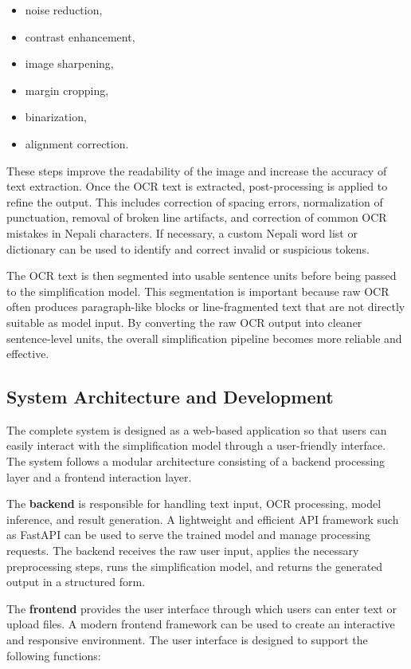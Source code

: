 \documentclass[12pt]{report}
\begin{document}
\begin{itemize}
    \item noise reduction,
    \item contrast enhancement,
    \item image sharpening,
    \item margin cropping,
    \item binarization,
    \item alignment correction.
\end{itemize}

These steps improve the readability of the image and increase the accuracy of text extraction. Once the OCR text is extracted, post-processing is applied to refine the output. This includes correction of spacing errors, normalization of punctuation, removal of broken line artifacts, and correction of common OCR mistakes in Nepali characters. If necessary, a custom Nepali word list or dictionary can be used to identify and correct invalid or suspicious tokens.

The OCR text is then segmented into usable sentence units before being passed to the simplification model. This segmentation is important because raw OCR often produces paragraph-like blocks or line-fragmented text that are not directly suitable as model input. By converting the raw OCR output into cleaner sentence-level units, the overall simplification pipeline becomes more reliable and effective.

\subsection{System Architecture and Development}

The complete system is designed as a web-based application so that users can easily interact with the simplification model through a user-friendly interface. The system follows a modular architecture consisting of a backend processing layer and a frontend interaction layer.

The \textbf{backend} is responsible for handling text input, OCR processing, model inference, and result generation. A lightweight and efficient API framework such as FastAPI can be used to serve the trained model and manage processing requests. The backend receives the raw user input, applies the necessary preprocessing steps, runs the simplification model, and returns the generated output in a structured form.

The \textbf{frontend} provides the user interface through which users can enter text or upload files. A modern frontend framework can be used to create an interactive and responsive environment. The user interface is designed to support the following functions:
\end{document}
